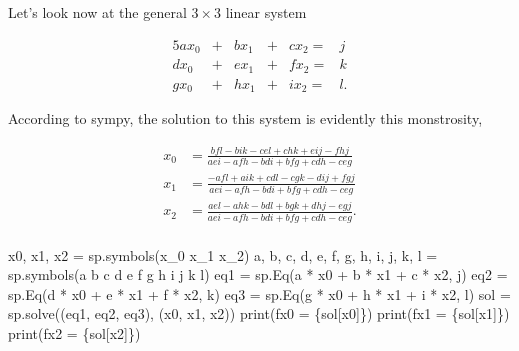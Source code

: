 \documentclass[
  letterpaper,
  DIV=11,
  numbers=noendperiod]{scrreprt}
\newenvironment{Shaded}{\begin{snugshade}}{\end{snugshade}}
\newcommand{\BuiltInTok}[1]{\textcolor[rgb]{0.00,0.23,0.31}{#1}}
\newcommand{\NormalTok}[1]{\textcolor[rgb]{0.00,0.23,0.31}{#1}}
\newcommand{\OperatorTok}[1]{\textcolor[rgb]{0.37,0.37,0.37}{#1}}
\newcommand{\SpecialCharTok}[1]{\textcolor[rgb]{0.37,0.37,0.37}{#1}}
\newcommand{\SpecialStringTok}[1]{\textcolor[rgb]{0.13,0.47,0.30}{#1}}
\newcommand{\StringTok}[1]{\textcolor[rgb]{0.13,0.47,0.30}{#1}}
\begin{document}
Let's look now at the general \(3 \times 3\) linear system

\begin{alignat*}{5}
   ax_0 & {}+{} &  bx_1 & {}+{} & cx_2 {}={} & j \\
   dx_0 & {}+{} &  ex_1 & {}+{} & fx_2 {}={} & k \\
   gx_0 & {}+{} &  hx_1 & {}+{} & ix_2 {}={} & l.
\end{alignat*}

According to sympy, the solution to this system is evidently this
monstrosity,

\begin{align*}
x_0 &= \frac{bfl - bik - cel + chk + eij - fhj}{aei - afh - bdi + bfg + cdh - ceg} \\
x_1 &= \frac{-afl + aik + cdl - cgk - dij + fgj}{aei - afh - bdi + bfg + cdh - ceg} \\
x_2 &= \frac{ael - ahk - bdl + bgk + dhj - egj}{aei - afh - bdi + bfg + cdh - ceg}. \\
\end{align*}

\begin{Shaded}
\begin{Highlighting}[]
\NormalTok{x0, x1, x2 }\OperatorTok{=}\NormalTok{ sp.symbols(}\StringTok{\textquotesingle{}x\_0 x\_1 x\_2\textquotesingle{}}\NormalTok{)}
\NormalTok{a, b, c, d, e, f, g, h, i, j, k, l }\OperatorTok{=}\NormalTok{ sp.symbols(}\StringTok{\textquotesingle{}a b c d e f g h i j k l\textquotesingle{}}\NormalTok{)}
\NormalTok{eq1 }\OperatorTok{=}\NormalTok{ sp.Eq(a }\OperatorTok{*}\NormalTok{ x0 }\OperatorTok{+}\NormalTok{ b }\OperatorTok{*}\NormalTok{ x1 }\OperatorTok{+}\NormalTok{ c }\OperatorTok{*}\NormalTok{ x2, j)}
\NormalTok{eq2 }\OperatorTok{=}\NormalTok{ sp.Eq(d }\OperatorTok{*}\NormalTok{ x0 }\OperatorTok{+}\NormalTok{ e }\OperatorTok{*}\NormalTok{ x1 }\OperatorTok{+}\NormalTok{ f }\OperatorTok{*}\NormalTok{ x2, k)}
\NormalTok{eq3 }\OperatorTok{=}\NormalTok{ sp.Eq(g }\OperatorTok{*}\NormalTok{ x0 }\OperatorTok{+}\NormalTok{ h }\OperatorTok{*}\NormalTok{ x1 }\OperatorTok{+}\NormalTok{ i }\OperatorTok{*}\NormalTok{ x2, l)}
\NormalTok{sol }\OperatorTok{=}\NormalTok{ sp.solve((eq1, eq2, eq3), (x0, x1, x2))}
\BuiltInTok{print}\NormalTok{(}\SpecialStringTok{f\textquotesingle{}x0 = }\SpecialCharTok{\{}\NormalTok{sol[x0]}\SpecialCharTok{\}}\SpecialStringTok{\textquotesingle{}}\NormalTok{)}
\BuiltInTok{print}\NormalTok{(}\SpecialStringTok{f\textquotesingle{}x1 = }\SpecialCharTok{\{}\NormalTok{sol[x1]}\SpecialCharTok{\}}\SpecialStringTok{\textquotesingle{}}\NormalTok{)}
\BuiltInTok{print}\NormalTok{(}\SpecialStringTok{f\textquotesingle{}x2 = }\SpecialCharTok{\{}\NormalTok{sol[x2]}\SpecialCharTok{\}}\SpecialStringTok{\textquotesingle{}}\NormalTok{)}
\end{Highlighting}
\end{Shaded}
\end{document}

